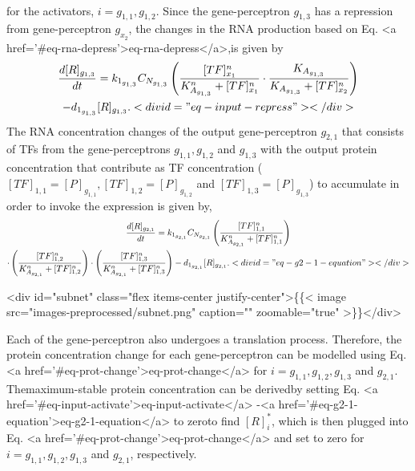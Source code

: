 \documentclass[twocolumn]{biophys-new}
\begin{document}
{{\begin{gather}
\end{gather}
for the activators, $i= g_{1,1}, g_{1,2}$.
Since the gene-perceptron $g_{1,3}$ has a repression from gene-perceptron $g_{x_2}$, the changes in the RNA production based on Eq. <a href='#eq-rna-depress'>eq-rna-depress</a>,is given by 
\vspace{-0.5em}
\begin{multline}
\dfrac{d[R]_{g_{1,3}}}{dt} = k_{1_{g_{1,3}}} C_{N_{g_{1,3}}}\left( \dfrac{[TF]_{x_1}^n}{K_{A_{g_{1,3}}}^n+ [TF]_{x_1}^n} \cdot \dfrac{K_{A_{g_{1,3}}}}{K_{A_{g_{1,3}}}+ [TF]_{x_2}^n}\right)\\ - d_{1_{g_{1,3}}} [R]_{g_{1,3}}.
<div id="eq-input-repress"></div>

\end{multline}
The RNA concentration changes of the output gene-perceptron $g_{2,1}$
that consists of TFs from the gene-perceptrons $g_{1,1}, g_{1,2}$ and $g_{1,3}$ with the output protein concentration that contribute as TF concentration ($[TF]_{1,1}= [P]_{g_{1,1}}, [TF]_{1,2}= [P]_{g_{1,2}}$ and $[TF]_{1,3}= [P]_{g_{1,3}}$) to accumulate in order to invoke the expression is given by,
\vspace{-1em}
\begin{multline}
\dfrac{d[R]_{g_{2,1}}}{dt} = k_{1_{g_{2,1}}} C_{N_{g_{2,1}}}\left( \dfrac{[TF]_{1,1}^n}{K_{A_{g_{2,1}}}^n+ [TF]_{1,1}^n} \right) \\ \cdot 
\left( \dfrac{[TF]_{1,2}^n}{K_{A_{g_{2,1}}}^n+ [TF]_{1,2}^n} \right) \cdot \left( \dfrac{[TF]_{1,3}^n}{K_{A_{g_{2,1}}}^n+ [TF]_{1,3}^n} \right) 
- d_{ 1_{g_{2,1}} } [R]_{g_{2,1}}.
<div id="eq-g2-1-equation"></div>

\end{multline}

\vspace{-1.5em}
<div id="subnet" class="flex items-center justify-center">\{\{< image src="images-preprocessed/subnet.png" caption="" zoomable="true" >\}\}</div>



Each of the gene-perceptron also undergoes a translation process. Therefore, the protein concentration change for each gene-perceptron can be modelled using Eq. <a href='#eq-prot-change'>eq-prot-change</a> for $i= g_{1,1}, g_{1,2}, g_{1,3}$ and $g_{2,1}$. Themaximum-stable protein concentration can be derivedby setting Eq. <a href='#eq-input-activate'>eq-input-activate</a> -<a href='#eq-g2-1-equation'>eq-g2-1-equation</a> to zeroto find $[R]_i^*$, which is 
 then plugged into Eq. <a href='#eq-prot-change'>eq-prot-change</a> and set to zero for $i= g_{1,1}, g_{1,2}, g_{1,3}$ and $g_{2,1}$, respectively. 

}}
\end{document}

